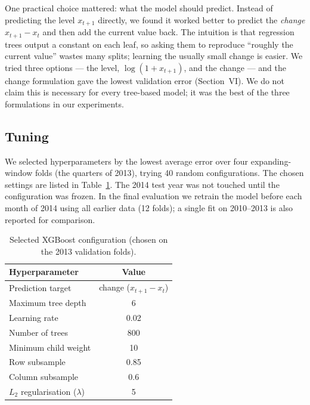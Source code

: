\documentclass[onecolumn,11pt,journal]{IEEEtran}
\begin{document}
One practical choice mattered: what the model should predict. Instead of predicting the level $x_{t+1}$ directly, we found it worked better to predict the \emph{change} $x_{t+1}-x_t$ and then add the current value back. The intuition is that regression trees output a constant on each leaf, so asking them to reproduce ``roughly the current value'' wastes many splits; learning the usually small change is easier. We tried three options --- the level, $\log(1+x_{t+1})$, and the change --- and the change formulation gave the lowest validation error (Section~VI). We do not claim this is necessary for every tree-based model; it was the best of the three formulations in our experiments.

\subsection{Tuning}
We selected hyperparameters by the lowest average error over four expanding-window folds (the quarters of 2013), trying 40 random configurations. The chosen settings are listed in Table~\ref{tab:hp}. The 2014 test year was not touched until the configuration was frozen. In the final evaluation we retrain the model before each month of 2014 using all earlier data (12 folds); a single fit on 2010--2013 is also reported for comparison.

\begin{table}[t]
\centering
\caption{Selected XGBoost configuration (chosen on the 2013 validation folds).}
\label{tab:hp}
\setlength{\tabcolsep}{8pt}
\begin{tabular}{lc}
\toprule
Hyperparameter & Value \\
\midrule
Prediction target & change ($x_{t+1}-x_t$) \\
Maximum tree depth & 6 \\
Learning rate & 0.02 \\
Number of trees & 800 \\
Minimum child weight & 10 \\
Row subsample & 0.85 \\
Column subsample & 0.6 \\
$L_2$ regularisation ($\lambda$) & 5 \\
\bottomrule
\end{tabular}
\end{table}
\end{document}
